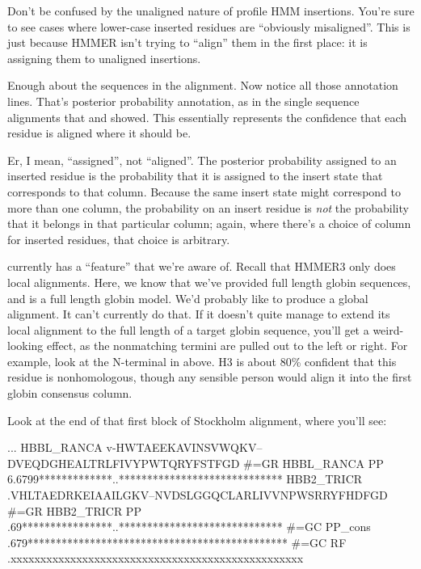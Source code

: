 Don't be confused by the unaligned nature of profile HMM
insertions. You're sure to see cases where lower-case inserted
residues are ``obviously misaligned''.  This is just because HMMER
isn't trying to ``align'' them in the first place: it is assigning
them to unaligned insertions.

Enough about the sequences in the alignment. Now notice all those
 annotation lines. That's posterior probability annotation,
as in the single sequence alignments that  and
 showed. This essentially represents the confidence
that each residue is aligned where it should be. 

Er, I mean, ``assigned'', not ``aligned''. The posterior probability
assigned to an inserted residue is the probability that it is assigned
to the insert state that corresponds to that column. Because the same
insert state might correspond to more than one column, the probability
on an insert residue is \emph{not} the probability that it belongs in
that particular column; again, where there's a choice of column for
inserted residues, that choice is arbitrary.

 currently has a ``feature'' that we're aware
of. Recall that HMMER3 only does local alignments. Here, we know that
we've provided full length globin sequences, and  is a
full length globin model. We'd probably like  to
produce a global alignment. It can't currently do that. If it doesn't
quite manage to extend its local alignment to the full length of a
target globin sequence, you'll get a weird-looking effect, as the
nonmatching termini are pulled out to the left or right. For example,
look at the N-terminal  in  above. H3 is
about 80\% confident that this residue is nonhomologous, though any
sensible person would align it into the first globin consensus column.

Look at the end of that first block of Stockholm alignment, where you'll
see:

\begin{sreoutput}
...
HBBL_RANCA         v-HWTAEEKAVINSVWQKV--DVEQDGHEALTRLFIVYPWTQRYFSTFGD
#=GR HBBL_RANCA PP 6.6799*************..*****************************
HBB2_TRICR         .VHLTAEDRKEIAAILGKV--NVDSLGGQCLARLIVVNPWSRRYFHDFGD
#=GR HBB2_TRICR PP .69****************..*****************************
#=GC PP_cons       .679**********************************************
#=GC RF            .xxxxxxxxxxxxxxxxxxxxxxxxxxxxxxxxxxxxxxxxxxxxxxxxx
\end{sreoutput}

